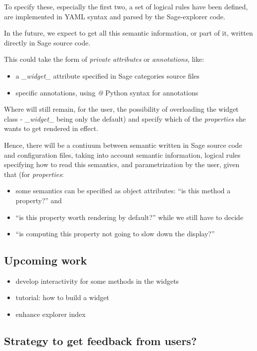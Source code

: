 \documentclass{deliverablereport}
\begin{document}
To specify these, especially the first two, a set of logical rules
have been defined, are implemented in YAML syntax and parsed by the
Sage-explorer code.

In the future, we expect to get all this semantic information, or part of it,
written directly in Sage source code.

This could take the form of \emph{private attributes} or \emph{annotations}, like:

\begin{itemize}
\item a \emph{\_widget\_} attribute specified in Sage categories source files
\item specific annotations, using \emph{@} Python syntax for annotations
  \end{itemize}

Where will still remain, for the user, the possibility of overloading
the widget class - \emph{\_widget\_} being only the default) and
specify which of the \emph{properties} she wants to get rendered in effect.

Hence, there will be a contiuum between semantic written in Sage
source code and configuration files, taking into account semantic
information, logical rules specifying how to read this semantics, and
parametrization by the user, given that (for \emph{properties}:

\begin{itemize}
\item some semantics can be specified as object attributes: ``is this method a
  property?'' and
  \item ``is this property worth rendering by default?''  while we
    still have to decide
  \item ``is computing this property not going to slow down the display?''
\end{itemize}

\subsection{Upcoming work}

\begin{itemize}
\item develop interactivity for some methods in the widgets
\item tutorial: how to build a widget
\item enhance explorer index
\end{itemize}

\subsection{Strategy to get feedback from users?}


\appendix

\end{document}
